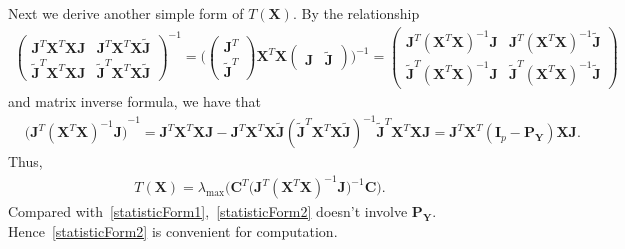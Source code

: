 \documentclass[12pt]{article} %
\newcommand{\bX}{\mathbf{X}}
\newcommand{\bP}{\mathbf{P}}
\newcommand{\bY}{\mathbf{Y}}
\newcommand{\bJ}{\mathbf{J}}
\newcommand{\bC}{\mathbf{C}}
\newcommand{\bI}{\mathbf{I}}
\theoremstyle{definition}
\begin{document}
Next we derive another simple form of $T(\bX)$.
By the relationship
\begin{equation*}
    \begin{aligned}
        \begin{pmatrix}
            \bJ^T \bX^T \bX\bJ & \bJ^T \bX^T \bX\tilde{\bJ}\\
            \tilde{\bJ}^T \bX^T \bX \bJ & \tilde{\bJ}^T \bX^T \bX \tilde{\bJ}
        \end{pmatrix}^{-1}
        =
        \Big(
        \begin{pmatrix}
            \bJ^T\\
            \tilde{\bJ}^T
        \end{pmatrix}
        \bX^T \bX
        \begin{pmatrix}
            \bJ &\tilde{\bJ}
        \end{pmatrix}
        \Big)^{-1}
        =
        \begin{pmatrix}
            \bJ^T {(\bX^T \bX)}^{-1}\bJ & \bJ^T {(\bX^T \bX)}^{-1}\tilde{\bJ}\\
            \tilde{\bJ}^T {(\bX^T \bX)}^{-1}\bJ & \tilde{\bJ}^T {(\bX^T \bX)}^{-1} \tilde{\bJ}
        \end{pmatrix}
    \end{aligned}
\end{equation*}
and matrix inverse formula, we have that
\begin{equation*}
    \begin{aligned}
        &{\big( \bJ^T {(\bX^T \bX)}^{-1}\bJ \big)}^{-1}
        =\bJ^T \bX^T \bX \bJ - \bJ^T \bX^T \bX\tilde{\bJ}{(\tilde{\bJ}^T \bX^T \bX \tilde{\bJ})}^{-1}
            \tilde{\bJ}^T \bX^T \bX\bJ 
        = \bJ^T \bX^T( \bI_p- \bP_{\bY}) \bX \bJ.
    \end{aligned}
\end{equation*}
Thus, 
\begin{equation}\label{statisticForm2}
    \begin{aligned}
        T(\bX)=
        \lambda_{\max}\Big(\bC^T\big( \bJ^T (\bX^T \bX)^{-1}\bJ \big)^{-1}\bC\Big).
    \end{aligned}
\end{equation}
Compared with~\eqref{statisticForm1},~\eqref{statisticForm2} doesn't involve $\bP_{\bY}$.
Hence~\eqref{statisticForm2} is convenient for computation.
\end{document}
